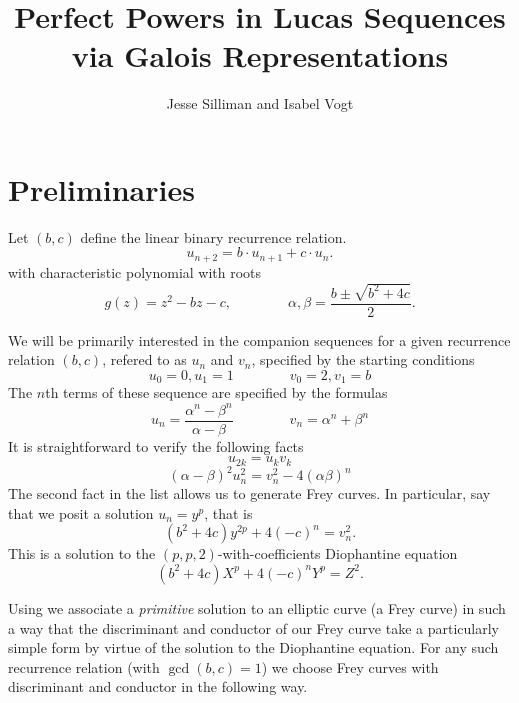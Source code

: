 \documentclass[12pt]{amsart}
\theoremstyle{definition}
\begin{document}
\title{Perfect Powers in Lucas Sequences via Galois Representations}
\author{Jesse Silliman and Isabel Vogt}

\maketitle


\section{Preliminaries}

Let $(b,c)$ define the linear binary recurrence relation.
\[ u_{n+2} = b\cdot u_{n+1}+ c\cdot u_n. \]
with characteristic polynomial with roots
\[ g(z) = z^2 - bz - c, \qquad \qquad \alpha, \beta = \frac{b \pm \sqrt{b^2+4c}}{2}.\]

We will be primarily interested in the companion sequences for a given recurrence relation $(b,c)$, refered to as $u_n$ and $v_n$, specified by the starting conditions
\[ u_0 = 0, u_1 = 1 \qquad \qquad v_0 = 2, v_1 = b \]
The $n$th terms of these sequence are specified by the formulas
\[u_n = \frac{\alpha^n - \beta^n}{\alpha - \beta} \qquad \qquad v_n = \alpha^n +\beta^n \]
It is straightforward to verify the following facts
\begin{equation}\label{fib2} u_{2k} = u_kv_k \end{equation}
\begin{equation}\label{gen_diophan}(\alpha - \beta)^2u_n^2 = v_n^2 - 4(\alpha\beta)^n \end{equation}
The second fact in the list allows us to generate Frey curves.  In particular, say that we posit a solution $u_n = y^p$, that is
\begin{equation}\label{rel_diophan} (b^2+4c)y^{2p}+4(-c)^n = v_n^2 .\end{equation}
This is a solution to the $(p,p,2)$-with-coefficients Diophantine equation
\[ (b^2+4c)X^p +4(-c)^nY^p = Z^2. \]

Using \cite{bennett04} we associate a \textit{primitive} solution to an elliptic curve (a Frey curve) in such a way that the discriminant and conductor of our Frey curve take a particularly simple form by virtue of the solution to the Diophantine equation.  For any such recurrence relation (with $\gcd(b,c)=1$) we choose Frey curves with discriminant and conductor in the following way.
\end{document}
